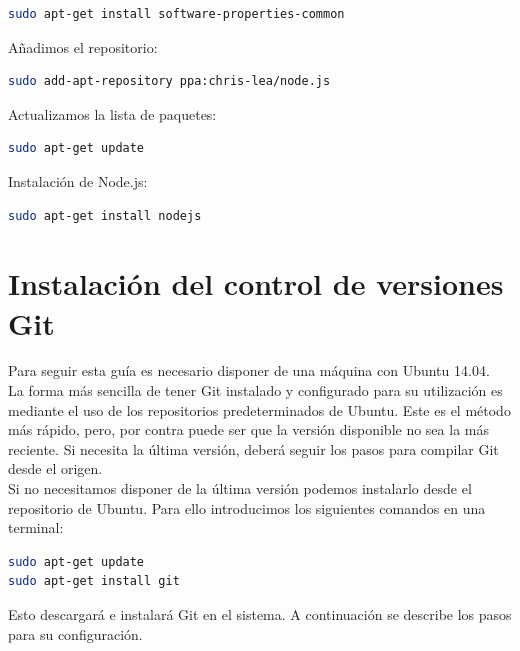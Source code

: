 \begin{appendix}
\begin{lstlisting}[language=bash]
sudo apt-get install software-properties-common
\end{lstlisting}


Añadimos el repositorio:\\

\begin{lstlisting}[language=bash]
sudo add-apt-repository ppa:chris-lea/node.js
\end{lstlisting}

Actualizamos la lista de paquetes:\\

\begin{lstlisting}[language=bash]
sudo apt-get update
\end{lstlisting}

Instalación de  Node.js:\\

\begin{lstlisting}[language=bash]
sudo apt-get install nodejs
\end{lstlisting}

\section{Instalación del control de versiones Git}

Para seguir esta guía es necesario disponer de una máquina con Ubuntu 14.04.\\

La forma más sencilla de tener Git instalado y configurado para su utilización es mediante el uso de los repositorios predeterminados de Ubuntu. 
Este es el método más rápido, pero, por contra puede ser que la versión disponible no sea la más reciente. 
Si necesita la última versión, deberá seguir los pasos para compilar Git desde el origen.\\

Si no necesitamos disponer de la última versión podemos instalarlo desde el repositorio de Ubuntu. Para ello introducimos los siguientes comandos en una terminal:\\

\begin{lstlisting}[language=bash]
sudo apt-get update
sudo apt-get install git
\end{lstlisting}

Esto descargará e instalará Git en el sistema. A continuación se describe los pasos para su configuración.


\end{appendix}

